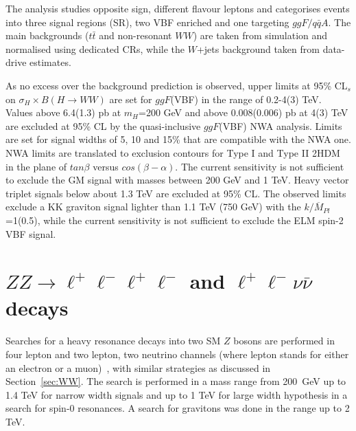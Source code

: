 \documentclass{PoS}
\begin{document}
The analysis studies opposite sign, different flavour leptons and categorises events into three signal regions (SR), two VBF enriched and one targeting $ggF/q\bar{q}A$. 
The main backgrounds ($t\bar{t}$ and non-resonant $WW$) are taken from simulation and normalised using dedicated CRs, while the $W$+jets background taken from data-drive estimates.

As no excess over the background prediction is observed, upper limits at 95\% CL$_s$ on $\sigma_H \times B(H\rightarrow WW)$ are set for $ggF$(VBF) in the range of 0.2-4(3) TeV. 
Values above 6.4(1.3) pb at $m_H$=200 GeV and above 0.008(0.006) pb at 4(3) TeV are excluded at 95\% CL by the quasi-inclusive $ggF$(VBF) NWA analysis.
Limits are set for signal widths of 5, 10 and 15\% that are compatible with the NWA one.
NWA limits are translated to exclusion contours  for Type I and Type II 2HDM in the plane of $tan \beta$ versus $cos(\beta-\alpha)$.
The current sensitivity is not sufficient to exclude the GM signal with masses between 200 GeV and 1 TeV.
Heavy vector triplet signals below about 1.3 TeV are excluded at 95\% CL. 
The observed limits exclude a KK graviton signal lighter than 1.1 TeV (750 GeV) with the $k/\overline{M}_{Pl}$=1(0.5), while the current sensitivity is not sufficient to exclude the ELM spin-2 VBF signal. 

\section{$ZZ\rightarrow \ell^+\ell^-\ell^+\ell^-$ and $\ell^+\ell^-\nu\bar{\nu}$ decays} %
\label{sec:ZZ}
Searches for a heavy resonance decays into two SM $Z$ bosons are performed in four lepton and two lepton, two neutrino channels (where lepton stands for either an electron or a muon)~\cite{HIGG-2016-19}, with similar strategies as discussed in Section~\ref{sec:WW}. 
The search is performed in a mass range from 200~GeV up to 1.4 TeV for narrow width signals and up to 1 TeV for large width hypothesis in a search for spin-0 resonances. A search for gravitons was done in the range up to 2 TeV.
\end{document}
